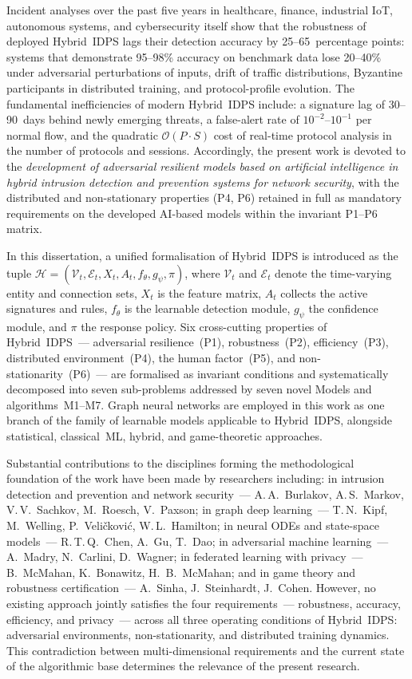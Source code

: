 \documentclass[12pt,a5paper]{article}
\begin{document}
Incident analyses over the past five years in healthcare,
finance, industrial IoT, autonomous systems, and cybersecurity
itself show that the robustness of deployed Hybrid~IDPS lags
their detection accuracy by 25--65~percentage points: systems
that demonstrate 95--98\% accuracy on benchmark data lose
20--40\% under adversarial perturbations of inputs, drift of
traffic distributions, Byzantine participants in distributed
training, and protocol-profile evolution. The fundamental
inefficiencies of modern Hybrid~IDPS include: a signature lag
of 30--90~days behind newly emerging threats, a false-alert rate
of $10^{-2}$--$10^{-1}$ per normal flow, and the quadratic
$\mathcal{O}(P\cdot S)$ cost of real-time protocol analysis in
the number of protocols and sessions. Accordingly, the present
work is devoted to the \emph{development of adversarial
resilient models based on artificial intelligence in hybrid
intrusion detection and prevention systems for network
security}, with the distributed and non-stationary properties
(P4, P6) retained in full as mandatory requirements on the
developed AI-based models within the invariant P1--P6 matrix.

In this dissertation, a unified formalisation of Hybrid~IDPS is
introduced as the tuple $\mathcal{H} = (\mathcal{V}_t,
\mathcal{E}_t, X_t, A_t, f_\theta, g_\psi, \pi)$, where
$\mathcal{V}_t$ and $\mathcal{E}_t$ denote the time-varying
entity and connection sets, $X_t$ is the feature matrix,
$A_t$ collects the active signatures and rules, $f_\theta$ is
the learnable detection module, $g_\psi$ the confidence
module, and $\pi$ the response policy. Six cross-cutting
properties of Hybrid~IDPS~--- adversarial resilience~(P1),
robustness~(P2), efficiency~(P3), distributed environment~(P4),
the human factor~(P5), and non-stationarity~(P6)~--- are
formalised as invariant conditions and systematically
decomposed into seven sub-problems addressed by seven novel
Models and algorithms~M1--M7. Graph neural networks are
employed in this work as one branch of the family of
learnable models applicable to Hybrid~IDPS, alongside
statistical, classical~ML, hybrid, and game-theoretic
approaches.

Substantial contributions to the disciplines forming the
methodological foundation of the work have been made by
researchers including: in intrusion detection and prevention
and network security~--- A.\,A.~Burlakov, A.\,S.~Markov,
V.\,V.~Sachkov, M.~Roesch, V.~Paxson; in graph deep
learning~--- T.\,N.~Kipf, M.~Welling, P.~Veli\v{c}kovi\'{c},
W.\,L.~Hamilton; in neural ODEs and state-space models~---
R.\,T.\,Q.~Chen, A.~Gu, T.~Dao; in adversarial machine
learning~--- A.~Madry, N.~Carlini, D.~Wagner; in federated
learning with privacy~--- B.~McMahan, K.~Bonawitz,
H.~B.~McMahan; and in game theory and robustness
certification~--- A.~Sinha, J.~Steinhardt, J.~Cohen. However,
no existing approach jointly satisfies the four requirements~---
robustness, accuracy, efficiency, and privacy~--- across all
three operating conditions of Hybrid~IDPS: adversarial
environments, non-stationarity, and distributed training
dynamics. This contradiction between multi-dimensional
requirements and the current state of the algorithmic base
determines the relevance of the present research.
\end{document}
